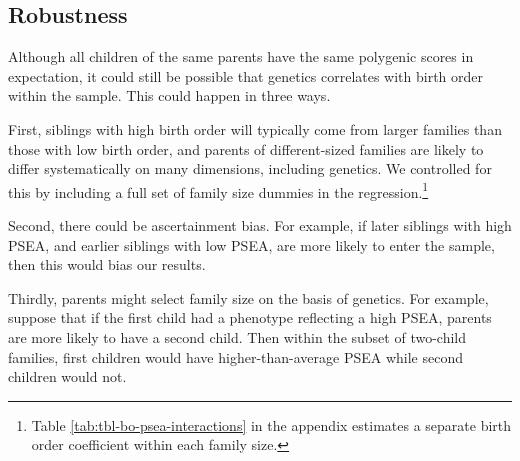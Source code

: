 \documentclass[
]{article}
\begin{document}
\FloatBarrier

\hypertarget{robustness}{%
\subsection{Robustness}\label{robustness}}

Although all children of the same parents have the same polygenic scores
in expectation, it could still be possible that genetics correlates with
birth order within the sample. This could happen in three ways.

First, siblings with high birth order will typically come from larger
families than those with low birth order, and parents of different-sized
families are likely to differ systematically on many dimensions,
including genetics. We controlled for this by including a full set of
family size dummies in the regression.\footnote{Table \ref{tab:tbl-bo-psea-interactions} in the appendix
  estimates a separate birth order coefficient within each family
  size.}

Second, there could be ascertainment bias. For example, if later
siblings with high PSEA, and earlier siblings with low PSEA, are more
likely to enter the sample, then this would bias our results.

Thirdly, parents might select family size on the basis of genetics. For
example, suppose that if the first child had a phenotype reflecting a
high PSEA, parents are more likely to have a second child. Then within
the subset of two-child families, first children would have
higher-than-average PSEA while second children would not.
\end{document}
